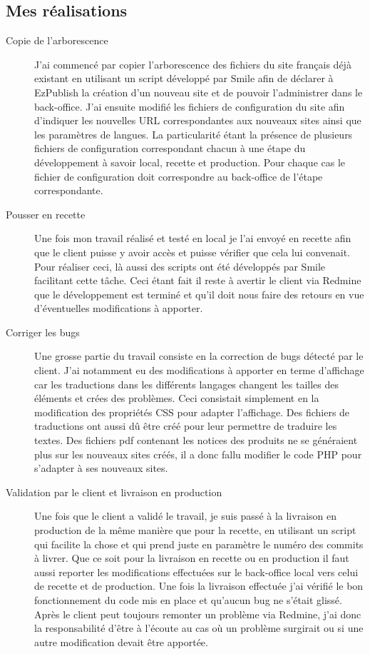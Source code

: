 \documentclass[a4paper,11pt,twoside]{report}
\begin{document}
    \subsection*{Mes réalisations}
      \begin{description}

	\item[Copie de l'arborescence] J'ai commencé par copier l'arborescence des fichiers du site français déjà existant en utilisant un script développé par Smile afin de déclarer à EzPublish la création d'un nouveau site et de pouvoir l'administrer dans le back-office. J'ai ensuite modifié les fichiers de configuration du site afin d'indiquer les nouvelles URL correspondantes aux nouveaux sites ainsi que les paramètres de langues. La particularité étant la présence de plusieurs fichiers de configuration correspondant chacun à une étape du développement à savoir local, recette et production. Pour chaque cas le fichier de configuration doit correspondre au back-office de l'étape correspondante.  
	\item[Pousser en recette] Une fois mon travail réalisé et testé en local je l'ai envoyé en recette afin que le client puisse y avoir accès et puisse vérifier que cela lui convenait. Pour réaliser ceci, là aussi des scripts ont été développés par Smile facilitant cette tâche. Ceci étant fait il reste à avertir le client via Redmine que le développement est terminé et qu'il doit nous faire des retours en vue d'éventuelles modifications à apporter.
	\item[Corriger les bugs] Une grosse partie du travail consiste en la correction de bugs détecté par le client. J'ai notamment eu des modifications à apporter en terme d'affichage car les traductions dans les différents langages changent les tailles des éléments et crées des problèmes. Ceci consistait simplement en la modification des propriétés CSS pour adapter l'affichage. Des fichiers de traductions ont aussi dû être créé pour leur permettre de traduire les textes. Des fichiers pdf contenant les notices des produits ne se généraient plus sur les nouveaux sites créés, il a donc fallu modifier le code PHP pour s'adapter à ses nouveaux sites. 
	\item[Validation par le client et livraison en production] Une fois que le client a validé le travail, je suis passé à la livraison en production de la même manière que pour la recette, en utilisant un script qui facilite la chose et qui prend juste en paramètre le numéro des commits à livrer. Que ce soit pour la livraison en recette ou en production il faut aussi reporter les modifications effectuées sur le back-office local vers celui de recette et de production. Une fois la livraison effectuée j'ai vérifié le bon fonctionnement du code mis en place et qu'aucun bug ne s'était glissé. Après le client peut toujours remonter un problème via Redmine, j'ai donc la responsabilité d'être à l'écoute au cas où un problème surgirait ou si une autre modification devait être apportée.  
      
      \end{description}
\end{document}
